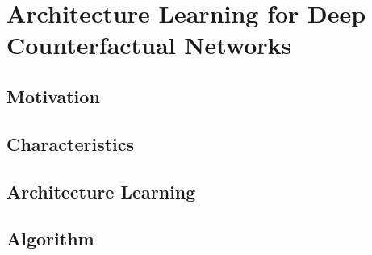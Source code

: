 %

\chapter{\label{ch:4-DCN-LAs}Architecture Learning for Deep Counterfactual Networks} 


\section{Motivation}

\section{Characteristics}

\section{Architecture Learning}

\section{Algorithm}
